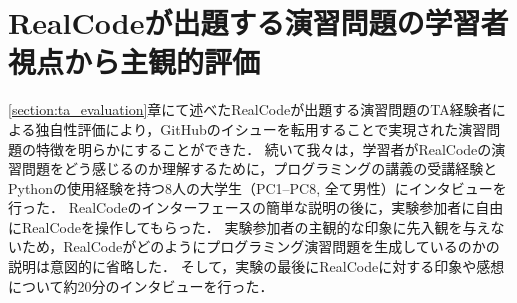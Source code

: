 \chapter{RealCodeが出題する演習問題の学習者視点から主観的評価}
\graphicspath{{Chapter6/Figs/}}

\label{section:interview-study}

\ref{section:ta_evaluation}章にて述べたRealCodeが出題する演習問題のTA経験者による独自性評価により，GitHubのイシューを転用することで実現された演習問題の特徴を明らかにすることができた．
続いて我々は，学習者がRealCodeの演習問題をどう感じるのか理解するために，プログラミングの講義の受講経験とPythonの使用経験を持つ8人の大学生（PC1--PC8, 全て男性）にインタビューを行った．
RealCodeのインターフェースの簡単な説明の後に，実験参加者に自由にRealCodeを操作してもらった．
実験参加者の主観的な印象に先入観を与えないため，RealCodeがどのようにプログラミング演習問題を生成しているのかの説明は意図的に省略した．
そして，実験の最後にRealCodeに対する印象や感想について約20分のインタビューを行った．




